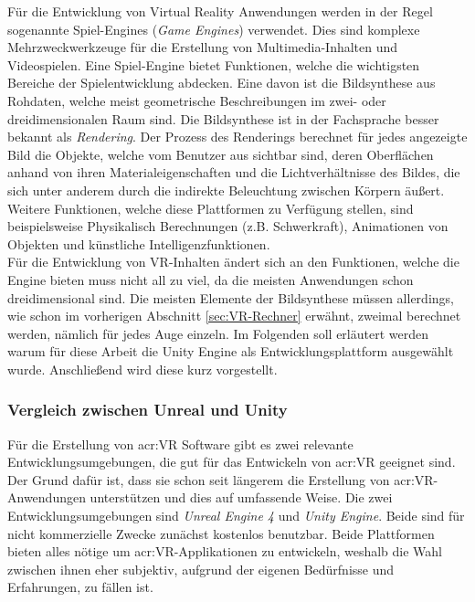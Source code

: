 Für die Entwicklung von Virtual Reality Anwendungen werden in der Regel sogenannte Spiel-Engines (\textit{Game Engines}) verwendet. Dies sind komplexe Mehrzweckwerkzeuge für die Erstellung von Multimedia-Inhalten und Videospielen. Eine Spiel-Engine bietet Funktionen, welche die wichtigsten Bereiche der Spielentwicklung abdecken. Eine davon ist die Bildsynthese aus Rohdaten, welche meist geometrische Beschreibungen im zwei- oder dreidimensionalen Raum sind. Die Bildsynthese ist in der Fachsprache besser bekannt als \textit{Rendering}. Der Prozess des Renderings berechnet für jedes angezeigte Bild die Objekte, welche vom Benutzer aus sichtbar sind, deren Oberflächen anhand von ihren Materialeigenschaften und die Lichtverhältnisse des Bildes, die sich unter anderem durch die indirekte Beleuchtung zwischen Körpern äußert. Weitere Funktionen, welche diese Plattformen zu Verfügung stellen, sind beispielsweise Physikalisch Berechnungen (z.B. Schwerkraft), Animationen von Objekten und künstliche Intelligenzfunktionen.\\

Für die Entwicklung von VR-Inhalten ändert sich an den Funktionen, welche die Engine bieten muss nicht all zu viel, da die meisten Anwendungen schon dreidimensional sind. Die meisten Elemente der Bildsynthese müssen allerdings, wie schon im vorherigen Abschnitt \ref{sec:VR-Rechner} erwähnt, zweimal berechnet werden, nämlich für jedes Auge einzeln. Im Folgenden soll erläutert werden warum für diese Arbeit die Unity Engine als Entwicklungsplattform ausgewählt wurde. Anschließend wird diese kurz vorgestellt.  

\subsubsection{Vergleich zwischen Unreal und Unity}

Für die Erstellung von \acrlong{acr:VR} Software gibt es zwei relevante Entwicklungsumgebungen, die gut für das Entwickeln von \acrlong{acr:VR} geeignet sind. Der Grund dafür ist, dass sie schon seit längerem die Erstellung von \acrshort{acr:VR}-Anwendungen unterstützen und dies auf umfassende Weise. Die zwei Entwicklungsumgebungen sind \textit{Unreal Engine 4} und \textit{Unity Engine}. Beide sind für nicht kommerzielle Zwecke zunächst kostenlos benutzbar. Beide Plattformen bieten alles nötige um \acrshort{acr:VR}-Applikationen zu entwickeln, weshalb die Wahl zwischen ihnen eher subjektiv, aufgrund der eigenen Bedürfnisse und Erfahrungen, zu fällen ist.\\ 

